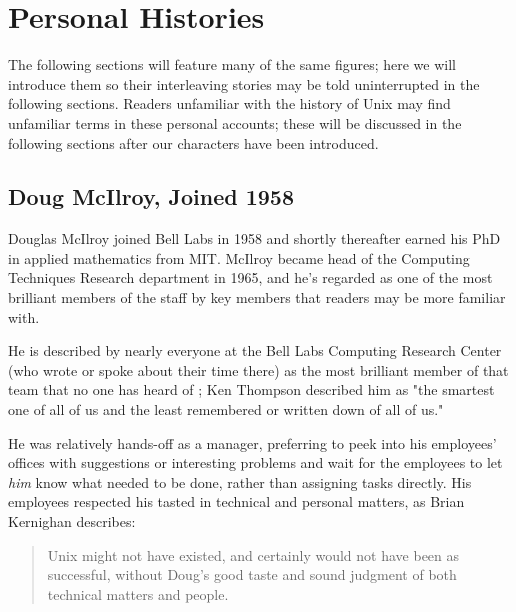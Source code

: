 
\section{Personal Histories}

The following sections will feature many of the same figures;
here we will introduce them so their interleaving stories may be told
uninterrupted in the following sections.
Readers unfamiliar with the history of Unix may find unfamiliar terms in these
personal accounts; these will be discussed in the following sections after
our characters have been introduced.

\subsection{Doug McIlroy, Joined 1958}

Douglas McIlroy joined Bell Labs in 1958 and shortly thereafter earned his
PhD in applied mathematics from MIT.
McIlroy became head of the Computing Techniques Research department in 1965, and he's regarded
as one of the most brilliant members of the staff by key members that readers may be more familiar with.

He is described by nearly everyone at the Bell Labs Computing Research Center
(who wrote or spoke about their time there)
as the most brilliant member of that team that no one has heard of
\cite{kernighan_interviews_thompson_2019}; Ken Thompson described him as
"the smartest one of all of us and the least remembered or written down of all of us."

He was relatively hands-off as a manager, preferring to peek into his employees' offices
with suggestions or interesting problems and wait for the employees to let \textit{him} know
what needed to be done, rather than assigning tasks directly.
His employees respected his tasted in technical and personal matters,
as Brian Kernighan describes\cite{kernighan_unix:_2020}:

\begin{quotation}
Unix might not have existed, and certainly
would not have been as successful, without Doug's good taste and sound
judgment of both technical matters and people.
\end{quotation}


